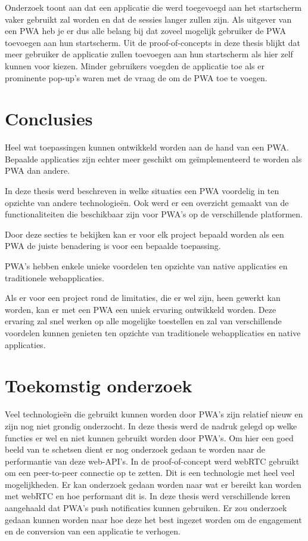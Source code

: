 \documentclass[a0,portrait]{a0poster}
\begin{document}
\begin{multicols}{2}
	Onderzoek toont aan dat een applicatie die werd toegevoegd aan het startscherm vaker gebruikt zal worden en dat de sessies langer zullen zijn. Als uitgever van een PWA heb je er dus alle belang bij dat zoveel mogelijk gebruiker de PWA toevoegen aan hun startscherm. Uit de proof-of-concepts in deze thesis blijkt dat meer gebruiker de applicatie zullen toevoegen aan hun startscherm als hier zelf kunnen voor kiezen. Minder gebruikers voegden de applicatie toe als er prominente pop-up's waren met de vraag de om de PWA toe te voegen.

\color{HoGentAccent1} 
\section*{Conclusies}
\color{black}

	Heel wat toepassingen kunnen ontwikkeld worden aan de hand van een PWA. Bepaalde applicaties zijn echter meer geschikt om geïmplementeerd te worden als PWA dan andere.
	
	In deze thesis werd beschreven in welke situaties een PWA voordelig in ten opzichte van andere technologieën. Ook werd er een overzicht gemaakt van de functionaliteiten die beschikbaar zijn voor PWA's op de verschillende platformen.
	
	Door deze secties te bekijken kan er voor elk project bepaald worden als een PWA de juiste benadering is voor een bepaalde toepassing. 
	
	PWA's hebben enkele unieke voordelen ten opzichte van native applicaties en traditionele webapplicaties. 

	Als er voor een project rond de limitaties, die er wel zijn, heen gewerkt kan worden, kan er met een PWA een uniek ervaring ontwikkeld worden.
	Deze ervaring zal snel werken op alle mogelijke toestellen en zal van verschillende voordelen kunnen genieten ten opzichte van traditionele webapplicaties en native applicaties.
	
	


\color{HoGentAccent1} 
\section*{Toekomstig onderzoek}
\color{black}

	Veel technologieën die gebruikt kunnen worden door PWA’s zijn relatief nieuw en zijn nog niet grondig onderzocht. In deze thesis werd de nadruk gelegd op welke functies er wel en niet kunnen gebruikt worden door PWA’s. Om hier een goed beeld van te schetsen dient er nog onderzoek gedaan te worden naar de performantie van deze web-API’s.
	In de proof-of-concept werd webRTC gebruikt om een peer-to-peer connectie op te zetten. Dit is een technologie met heel veel mogelijkheden. Er kan onderzoek gedaan worden naar wat er bereikt kan worden met webRTC en hoe performant dit is.
	In deze thesis werd verschillende keren aangehaald dat PWA’s push notificaties kunnen gebruiken. Er zou onderzoek gedaan kunnen worden naar hoe deze het best ingezet worden om de engagement en de conversion van een applicatie te verhogen.


\end{multicols}
\end{document}
